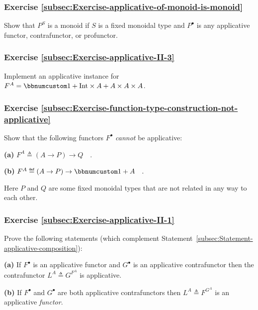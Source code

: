 \subsubsection{Exercise \label{subsec:Exercise-applicative-of-monoid-is-monoid}\ref{subsec:Exercise-applicative-of-monoid-is-monoid}}

Show that $P^{S}$ is a monoid if $S$ is a fixed monoidal type and
$P^{\bullet}$ is any applicative functor, contrafunctor, or profunctor.

\subsubsection{Exercise \label{subsec:Exercise-applicative-II-3}\ref{subsec:Exercise-applicative-II-3}}

Implement an applicative instance for $F^{A}=\bbnum 1+\text{Int}\times A+A\times A\times A$.

\subsubsection{Exercise \label{subsec:Exercise-function-type-construction-not-applicative}\ref{subsec:Exercise-function-type-construction-not-applicative}}

Show that the following functors $F^{\bullet}$ \emph{cannot} be applicative: 

\textbf{(a)} $F^{A}\triangleq(A\rightarrow P)\rightarrow Q\quad.$

\textbf{(b)} $F^{A}\triangleq\left(A\rightarrow P\right)\rightarrow\bbnum 1+A\quad.$

Here $P$ and $Q$ are some fixed monoidal types that are not related
in any way to each other.

\subsubsection{Exercise \label{subsec:Exercise-applicative-II-1}\ref{subsec:Exercise-applicative-II-1}}

Prove the following statements (which complement Statement~\ref{subsec:Statement-applicative-composition}):

\textbf{(a)} If $F^{\bullet}$ is an applicative functor and $G^{\bullet}$
is an applicative contrafunctor then the contrafunctor $L^{A}\triangleq G^{F^{A}}$
is applicative.

\textbf{(b)} If $F^{\bullet}$ and $G^{\bullet}$ are both applicative
contrafunctors then $L^{A}\triangleq F^{G^{A}}$ is an applicative
\emph{functor}.

